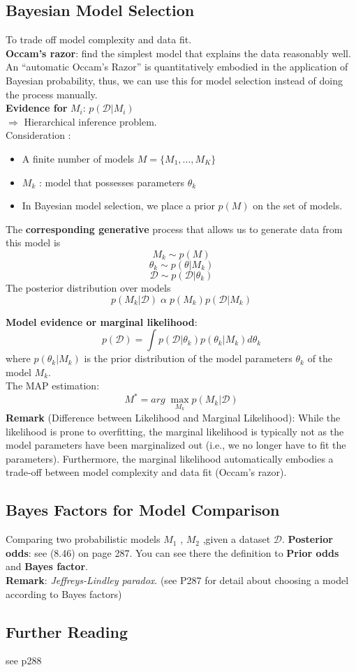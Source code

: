 \subsection{Bayesian Model Selection}
To trade off model complexity and data fit. \\
\textbf{Occam's razor}: find the simplest model that explains the data reasonably well.\\ An “automatic Occam’s Razor” is quantitatively embodied in the application of Bayesian probability, thus, we can use this for model selection instead of doing the process manually. \\
\textbf{Evidence for }$M_i$: $p(\mathcal{D} | M_i)$\\
$\Rightarrow$ Hierarchical inference problem. \\
Consideration :
\begin{itemize}
	\item A finite number of models $M = \{ M_1,\dots,M_K\}$
	\item $M_k$ : model that possesses parameters $\theta_k$
	\item In Bayesian model selection, we place a prior $p(M)$ on the set of models.
\end{itemize}
The \textbf{corresponding generative} process that allows us to generate data from this model is 
\[
M_k \sim p(M) \tag{8.40}
\]
\[
\theta_k \sim p(\theta | M_k) \tag{8.41}
\]
\[
\mathcal{D} \sim p(\mathcal{D} | \theta_k) \tag{8.42}
\]
The posterior distribution over models
\[
p(M_k|\mathcal{D}) \; \alpha \; p(M_k) p(\mathcal{D}|M_k) \tag{8.43}
\]

\textbf{Model evidence or marginal likelihood}: 
\[
p(\mathcal{D}) = \int p(\mathcal{D} | \theta_k) p(\theta_k|M_k) d\theta_k \tag{8.44}
\]
where $p(\theta_k|M_k)$ is the prior distribution of the model parameters $\theta_k$ of the model $M_k$. \\
The MAP estimation:
\[
M^{\text{*}} = arg \; \max_{M_k} p(M_k | \mathcal{D}) \tag{8.45}
\]
\textbf{Remark} (Difference between Likelihood and Marginal Likelihood): While the likelihood is prone to overfitting, the marginal likelihood is typically not as the model parameters have been marginalized out (i.e., we no longer have to fit the parameters). Furthermore, the marginal likelihood automatically embodies a trade-off between model complexity and data fit (Occam’s razor).

\subsection{Bayes Factors for Model Comparison}
Comparing two probabilistic models $M_1$ , $M_2$ ,given a dataset $\mathcal{D}$.
\textbf{Posterior odds}: see (8.46) on page 287. You can see there the definition to \textbf{Prior odds} and \textbf{Bayes factor}.\\
\textbf{Remark}: \textit{Jeffreys-Lindley paradox}. (see P287 for detail about choosing a model according to Bayes factors)
	
\subsection{Further Reading}
see p288